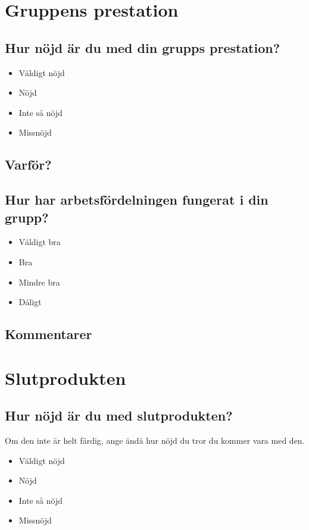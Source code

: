 \documentclass[10pt,a4paper]{article}
\begin{document}
\section*{Gruppens prestation}
\subsection*{Hur nöjd är du med din grupps prestation?}
\begin{itemize}
\item Väldigt nöjd
\item Nöjd
\item Inte så nöjd
\item Missnöjd
\end{itemize}

\subsection*{Varför?}

\subsection*{Hur har arbetsfördelningen fungerat i din grupp?}
\begin{itemize}
\item Väldigt bra
\item Bra
\item Mindre bra
\item Dåligt
\end{itemize}

\subsection*{Kommentarer}

\section*{Slutprodukten}
\subsection*{Hur nöjd är du med slutprodukten?}
Om den inte är helt färdig, ange ändå hur nöjd du tror du kommer vara med den.
\begin{itemize}
\item Väldigt nöjd
\item Nöjd
\item Inte så nöjd
\item Missnöjd
\end{itemize}
\end{document}
